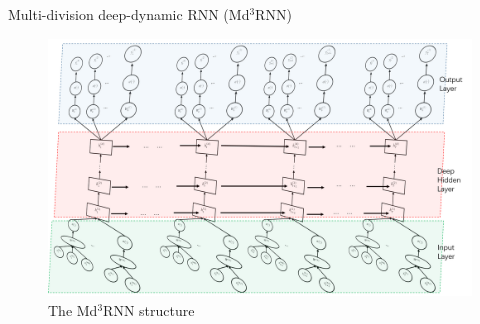 
Multi-division deep-dynamic RNN (Md$^3$RNN)

\begin{figure}[!t]
  \centering
  \includegraphics[width=0.8\columnwidth]{./img/RNNstruct.png}
  \caption{The Md$^3$RNN structure}
  \label{fig:rnn}
\end{figure}